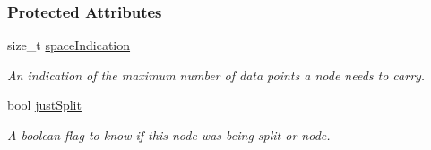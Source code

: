 \subsubsection*{\-Protected \-Attributes}
\begin{DoxyCompactItemize}
\item 
size\-\_\-t \hyperlink{classsubpavings_1_1SPSVnode_a98a73d1c8dafe1d9248aeec76c8f74ef}{space\-Indication}
\begin{DoxyCompactList}\small\item\em \-An indication of the maximum number of data points a node needs to carry. \end{DoxyCompactList}\item 
bool \hyperlink{classsubpavings_1_1SPSVnode_a288af7a8149effcb2d19e163e217e951}{just\-Split}
\begin{DoxyCompactList}\small\item\em \-A boolean flag to know if this node was being split or node. \end{DoxyCompactList}\end{DoxyCompactItemize}

